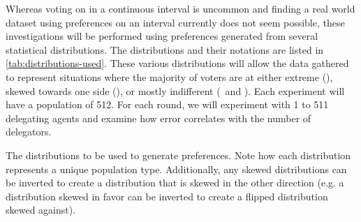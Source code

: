 Whereas voting on in a continuous interval is uncommon and finding a real world dataset
using preferences on an interval currently does not seem possible, these investigations
will be performed using preferences generated from several statistical distributions.
The distributions and their notations are listed in \autoref{tab:distributions-used}.
These various distributions will allow the data gathered to represent situations
where the majority of voters are at either extreme (),
skewed towards one side (), or mostly indifferent
(\gaussiandist\ and ).
Each experiment will have a population of 512.
For each round, we will experiment with 1 to 511 delegating agents and examine how
error correlates with the number of delegators.

\begin{table}[!htbp]
    \renewcommand{\arraystretch}{1.3}

    \caption{
        The distributions to be used to generate preferences.
        Note how each distribution represents a unique population type.
        Additionally, any skewed distributions can be inverted to create a
        distribution that is skewed in the other direction (e.g. a distribution
        skewed in favor can be inverted to create a flipped distribution skewed
        against).
    }
    \label{tab:distributions-used}

    \centering
    
\end{table}

